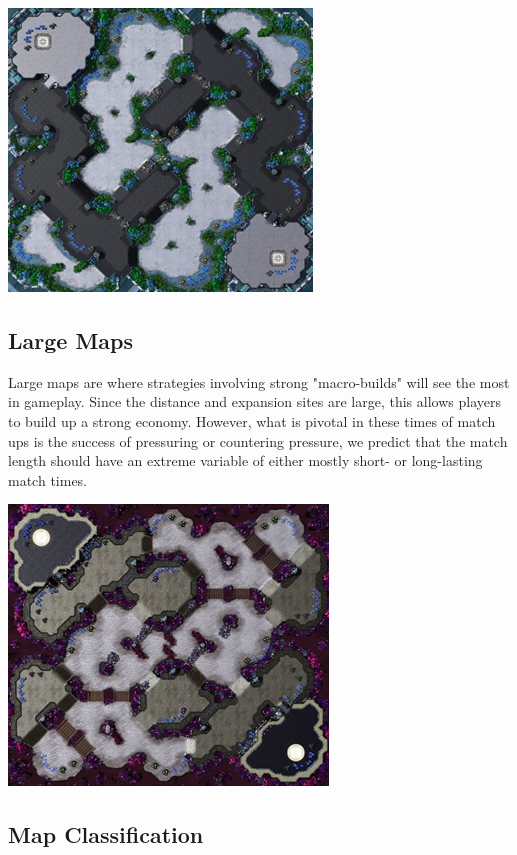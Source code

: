 \documentclass[a4paper,12pt]{report}
\begin{document}
\begin{center}
    \captionsetup{type=figure}
    \includegraphics[width=.5\linewidth]{media/mediumMap.png}
\end{center}

\subsection{Large Maps}

Large maps are where strategies involving strong "macro-builds" will see the most in gameplay. Since the distance and expansion sites are large, this allows players to build up a strong economy. However, what is pivotal in these times of match ups is the success of pressuring or countering pressure, we predict that the match length should have an extreme variable of either mostly short- or long-lasting match times. 

\begin{center}
    \captionsetup{type=figure}
    \includegraphics[width=.5\linewidth]{media/LargeMap.png}
\end{center}

\subsection{Map Classification}
\end{document}
